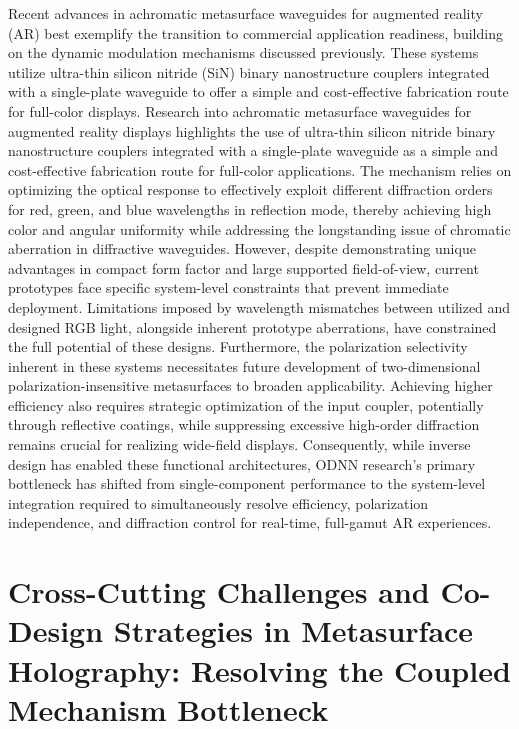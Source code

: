 Recent advances in achromatic metasurface waveguides for augmented reality (AR) best exemplify the transition to commercial application readiness, building on the dynamic modulation mechanisms discussed previously. These systems utilize ultra-thin silicon nitride (SiN) binary nanostructure couplers integrated with a single-plate waveguide to offer a simple and cost-effective fabrication route for full-color displays. Research into achromatic metasurface waveguides for augmented reality displays highlights the use of ultra-thin silicon nitride binary nanostructure couplers integrated with a single-plate waveguide as a simple and cost-effective fabrication route for full-color applications. \citep{doi_10_1038_s41377_025_01761_w_a73a6b84} The mechanism relies on optimizing the optical response to effectively exploit different diffraction orders for red, green, and blue wavelengths in reflection mode, thereby achieving high color and angular uniformity while addressing the longstanding issue of chromatic aberration in diffractive waveguides. However, despite demonstrating unique advantages in compact form factor and large supported field-of-view, current prototypes face specific system-level constraints that prevent immediate deployment. Limitations imposed by wavelength mismatches between utilized and designed RGB light, alongside inherent prototype aberrations, have constrained the full potential of these designs. Furthermore, the polarization selectivity inherent in these systems necessitates future development of two-dimensional polarization-insensitive metasurfaces to broaden applicability. Achieving higher efficiency also requires strategic optimization of the input coupler, potentially through reflective coatings, while suppressing excessive high-order diffraction remains crucial for realizing wide-field displays. Consequently, while inverse design has enabled these functional architectures, ODNN research's primary bottleneck has shifted from single-component performance to the system-level integration required to simultaneously resolve efficiency, polarization independence, and diffraction control for real-time, full-gamut AR experiences. \citep{doi_10_1038_s41377_025_01761_w_a73a6b84}

\section{Cross-Cutting Challenges and Co-Design Strategies in Metasurface Holography: Resolving the Coupled Mechanism Bottleneck}\label{cross-cutting-challenges-and-co-design-strategies-in-metasurface-holography-resolving-the-coupled-mechanism-bottleneck}

